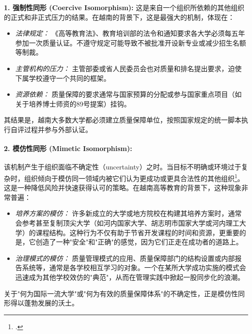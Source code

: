 \textbf{1. 强制性同形 (Coercive Isomorphism):} 这是来自一个组织所依赖的其他组织的正式和非正式压力的结果。在越南的背景下，这是最强大的机制，体现在：
\begin{itemize}
    \item \textit{法律规定：} 《高等教育法》、教育培训部的法令和通知要求各大学必须每五年参加一次质量认证。不遵守规定可能导致不被批准开设新专业或减少招生名额等制裁。
    \item \textit{主管机构的压力：} 主管部委或省人民委员会也对质量和排名提出要求，迫使下属学校遵守一个共同的框架。
    \item \textit{资源依赖：} 质量保障的要求通常与国家预算的分配或参与国家重点项目（如关于培养博士师资的89号提案）挂钩。
\end{itemize}
其结果是，越南大多数大学都必须建立质量保障单位，按照国家规定的统一脚本执行自评过程并参与外部认证。





\paragraph{2. 模仿性同形 (Mimetic Isomorphism):}
该机制产生于组织面临不确定性（uncertainty）之时。当目标不明确或环境过于复杂时，组织倾向于模仿同一领域内被它们认为更成功或更具合法性的其他组织\footcite{DiMaggioPowell1983}。这是一种降低风险并快速获得认可的策略。在越南高等教育的背景下，这种现象非常普遍：
\begin{itemize}
    \item \textit{培养方案的模仿：} 许多新成立的大学或地方院校在构建其培养方案时，通常会参考甚至复制顶尖大学（如河内国家大学、胡志明市国家大学或河内理工大学）的课程结构。这种行为不仅有助于节省开发课程的时间和资源，更重要的是，它创造了一种"安全"和"正确"的感觉，因为它们正走在成功者的道路上。
    \item \textit{治理模式的模仿：} 质量管理模式的应用、质量保障部门的结构设置或内部报告系统等，通常是各学校相互学习的对象。一个在某所大学成功实施的模式会迅速成为其他学校效仿的"典范"，从而在管理实践中掀起一股同步化的浪潮。
\end{itemize}
关于"何为国际一流大学"或"何为有效的质量保障体系"的不确定性，正是模仿性同形得以蓬勃发展的沃土。


